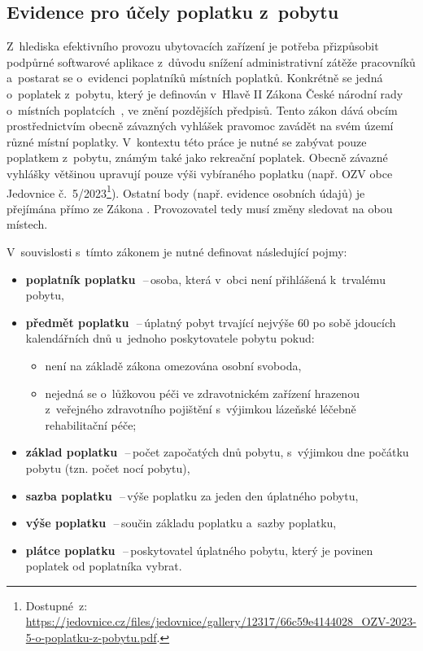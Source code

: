 \subsection{Evidence pro účely poplatku z~pobytu}
\label{sec:poplatky}
Z~hlediska efektivního provozu ubytovacích zařízení je potřeba přizpůsobit podpůrné softwarové aplikace z~důvodu snížení administrativní zátěže pracovníků a~postarat se o~evidenci poplatníků místních poplatků.
Konkrétně se jedná o~poplatek z~pobytu, který je definován v~Hlavě II Zákona České národní rady o~místních poplatcích~\cite{cz-1990-565}, ve znění pozdějších předpisů.
Tento zákon dává obcím prostřednictvím obecně závazných vyhlášek pravomoc zavádět na svém území různé místní poplatky.
V~kontextu této práce je nutné se zabývat pouze poplatkem z~pobytu, známým také jako rekreační poplatek.
Obecně závazné vyhlášky většinou upravují pouze výši vybíraného poplatku (např. OZV obce Jedovnice č.~5/2023\footnote{Dostupné~z: \url{https://jedovnice.cz/files/jedovnice/gallery/12317/66c59e4144028_OZV-2023-5-o-poplatku-z-pobytu.pdf}.}).
Ostatní body (např. evidence osobních údajů) je přejímána přímo ze Zákona \cite{cz-1990-565}.
Provozovatel tedy musí změny sledovat na obou místech.

\vspace{8px} \noindent
V~souvislosti s~tímto zákonem je nutné definovat následující pojmy:
\begin{itemize}
    \item \textbf{poplatník poplatku}~\cite[\S~3]{cz-1990-565}\,--\,osoba, která v~obci není přihlášená k~trvalému pobytu,
    \item \textbf{předmět poplatku}~\cite[\S~3a]{cz-1990-565}\,--\,úplatný pobyt trvající nejvýše 60 po sobě jdoucích kalendářních dnů u~jednoho poskytovatele pobytu pokud:
    \begin{itemize}
        \item není na základě zákona omezována osobní svoboda,
        \item nejedná se o~lůžkovou péči ve zdravotnickém zařízení hrazenou z~veřejného zdravotního pojištění s~výjimkou lázeňské léčebně rehabilitační péče;
    \end{itemize}
    \item \textbf{základ poplatku}~\cite[\S~3c]{cz-1990-565}\,--\,počet započatých dnů pobytu, s~výjimkou dne počátku pobytu (tzn. počet nocí pobytu),
    \item \textbf{sazba poplatku}~\cite[\S~3d]{cz-1990-565}\,--\,výše poplatku za jeden den úplatného pobytu,
    \item \textbf{výše poplatku}~\cite[\S~3e]{cz-1990-565}\,--\,součin základu poplatku a~sazby poplatku,
    \item \textbf{plátce poplatku}~\cite[\S~3f]{cz-1990-565}\,--\,poskytovatel úplatného pobytu, který je povinen poplatek od poplatníka vybrat.
\end{itemize}

